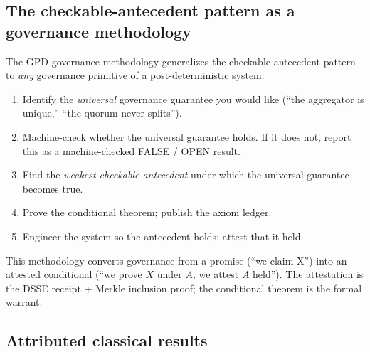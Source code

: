\documentclass[11pt,letterpaper]{article}
\theoremstyle{definition}
\begin{document}
\subsection{The checkable-antecedent pattern as a governance methodology}

The GPD governance methodology generalizes the checkable-antecedent pattern to
\emph{any} governance primitive of a post-deterministic system:

\begin{enumerate}
\item Identify the \emph{universal} governance guarantee you would like
  (``the aggregator is unique,'' ``the quorum never splits'').
\item Machine-check whether the universal guarantee holds.  If it does not,
  report this as a machine-checked FALSE / OPEN result.
\item Find the \emph{weakest checkable antecedent} under which the universal
  guarantee becomes true.
\item Prove the conditional theorem; publish the axiom ledger.
\item Engineer the system so the antecedent holds; attest that it held.
\end{enumerate}
This methodology converts governance from a promise (``we claim X'') into an
attested conditional (``we prove $X$ under $A$, we attest $A$ held'').  The
attestation is the DSSE receipt + Merkle inclusion proof; the conditional theorem
is the formal warrant.

\subsection{Attributed classical results}
\end{document}
